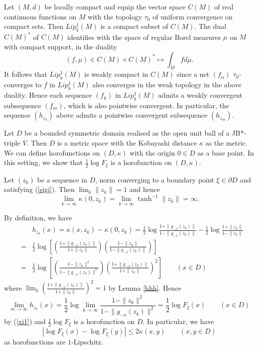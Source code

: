 \documentclass[12pt, twoside]{article}
\theoremstyle{definition}
\numberwithin{equation}{section}
\begin{document}
 Let $(M,d)$ be locally compact and equip the vector space $C(M)$ of real continuous functions on $M$
 with the topology $\tau_0$ of uniform convergence on compact sets. Then  $Lip_b^1(M)$
is a compact subset of $C(M)$.  The dual $C(M)^*$ of $C(M)$ identifies with
the space of regular Borel measures $\mu$ on $M$ with compact support, in the duality
$$ (f,\mu)\in C(M) \times C(M)^* \mapsto \int_M fd\mu.$$
It follows that  $Lip_b^1(M)$ is weakly compact in $C(M)$
since a net $(f_\alpha)$ $\tau_0$-converges to $f$ in $Lip_b^1(M)$
also converges in the weak topology in the above duality. Hence each sequence
$(f_k)$ in $Lip_b^1(M)$ admits a weakly convergent subsequence $(f_{m})$, which
is also pointwise convergent. In particular, the sequence $(h_{z_k})$ above admits a
pointwise convergent subsequence $(h_{z_m})$.

Let $D$ be a bounded symmetric domain realised as the open unit ball of a JB*-triple $V$. Then $D$ is a metric space
with the Kobayashi distance $\kappa$ as the metric.
We can define horofunctions on $(D, \kappa)$ with the origin $0\in D$
as a base point. In this setting, we show that %
 $\frac{1}{2}\log F_\xi$ is a horofunction on $(D, \kappa)$.

Let $(z_k)$ be a sequence  in $D$,  norm converging to a boundary point $\xi\in \partial D$
and satisfying (\ref{sigi}).  Then
$\lim_k \|z_k\|=1$ and hence
$$\lim_{k\rightarrow \infty} \kappa (0, z_k) =\lim_{k\rightarrow \infty} \tanh^{-1}\|z_k\| = \infty.$$


By definition, we have
 \begin{eqnarray}\label{gh}
&&h_{z_k}(x) = \kappa (x,{z_k})-\kappa (0,{z_k}) = \frac{1}{2}\log \frac{1+ \|g_{-x}({z_k})\|}{1-\|g_{-x}({z_k})\|} -
 \frac{1}{2}\log \frac{1+ \|{z_k}\|}{1-\|{z_k}\|} \nonumber\\
&=&  \frac{1}{2}\log\left[ \left(\frac{1+ \|g_{-x}({z_k})\|}{1+\|{z_k}\|}\right)\left(\frac{1- \|{z_k}\|}{1-\|g_{-x}({z_k})\|}\right)\right]\nonumber\\
&=& \frac{1}{2}\log \left[\left(\frac{1- \|{z_k}\|^2}{1-\|g_{-x}({z_k})\|^2}\right)
\left(\frac{1+\|g_{-x}({z_k})\|}{1+ \|{z_k}\|}\right)^2 \right]\qquad (x\in D)
\end{eqnarray}
where $\lim_k \left(\frac{1+\|g_{-x}({z_k})\|}{1+ \|{z_k}\|}\right)^2  =1$ by
 Lemma \ref{hhh}. Hence
\begin{equation}\label{zm}
 \lim_{m\rightarrow \infty} h_{z_k}(x)=\frac{1}{2} \log \lim_{k\rightarrow \infty} \frac{1- \|{z_k}\|^2}{1-\|g_{-x}({z_k})\|^2}
=\frac{1}{2} \log F_\xi(x) \qquad (x\in D)
\end{equation} by (\ref{xi1}) and $ \frac{1}{2} \log F_\xi$
is a horofunction on $D$. In particular, we have
\begin{equation}\label{lips}
|\log F_\xi (x) - \log F_\xi (y)| \leq 2 \kappa (x,y) \qquad (x,y \in D)
\end{equation}
as horofunctions are $1$-Lipschitz.
\end{document}

